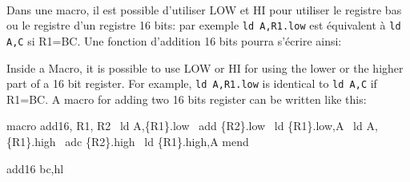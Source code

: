 \paragraph{}

\begin{xfr}
Dans une macro, il est possible d'utiliser LOW et HI pour utiliser le registre bas ou le registre d'un registre 16 bits:
par exemple \texttt{ld A,{R1}.low}  est équivalent à \texttt{ld A,C} si R1=BC.
Une fonction d'addition 16 bits pourra s'écrire ainsi:
\end{xfr}

\begin{xen}
Inside a Macro, it is possible to use LOW or HI for using the lower or the higher part of a 16 bit register.
For example, \texttt{ld A,{R1}.low} is identical to \texttt{ld A,C} if R1=BC.
A macro for adding two 16 bits register can be written like this:
\end{xen}

\begin{code}
macro add16, R1, R2
\ ld A,\{R1\}.low
\ add \{R2\}.low
\ ld \{R1\}.low,A
\ ld A,\{R1\}.high
\ adc \{R2\}.high
\ ld \{R1\}.high,A
\medskip
mend

add16 bc,hl
\end{code}
